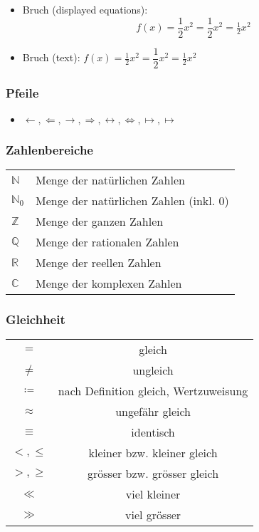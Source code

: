 \documentclass{scrartcl} %
\begin{document}
\begin{multicols*}{3}
\begin{itemize}
    						
    						\item Bruch (displayed equations): \[
       f(x) =  \frac{1}{2} x^2 = \dfrac{1}{2} x^2 = \tfrac{1}{2} x^2
    \]
                            \item Bruch (text): $
       f(x) =  \frac{1}{2} x^2 = \dfrac{1}{2} x^2 = \tfrac{1}{2} x^2
    $
                            
					    \end{itemize}
					\subsubsection{Pfeile}
					    \begin{itemize}
					        \item
                        $\leftarrow, \Leftarrow, \rightarrow, \Rightarrow, \leftrightarrow, \Longleftrightarrow, \mapsto, \longmapsto$
					    \end{itemize}
					\subsubsection{Zahlenbereiche}
					    \begin{tabular}[h]{|l|l|}
					        $\mathbb{N}$ & Menge der natürlichen Zahlen \\ 
					        $\mathbb{N}_{0}$ & Menge der natürlichen Zahlen (inkl. 0) \\
					        $\mathbb{Z}$ & Menge der ganzen Zahlen\\
					        $\mathbb{Q}$ & Menge der rationalen Zahlen\\
					        $\mathbb{R}$ & Menge der reellen Zahlen\\
					        $\mathbb{C}$ & Menge der komplexen Zahlen\\
					    \end{tabular}
					\subsubsection{Gleichheit}
					    \begin{tabular}[h]{|c|c|}
					         $=$  & gleich \\
					         $\neq$ & ungleich \\
					         $\coloneqq$  & nach Definition gleich, Wertzuweisung \\
					         $\approx$ & ungefähr gleich \\
					         $\equiv$ & identisch \\
					         $<, \leq$ & kleiner bzw. kleiner gleich \\
					         $>, \geq$ & grösser bzw. grösser gleich \\
					         $\ll$ & viel kleiner \\
					         $\gg$ & viel grösser \\
					    \end{tabular}

\end{multicols*}
\end{document}
